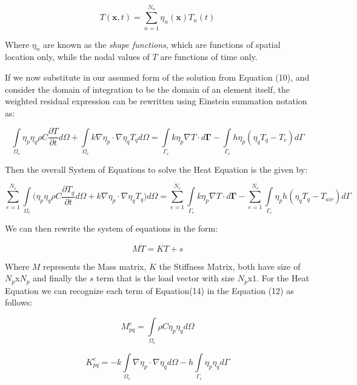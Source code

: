 \documentclass[12pt]{article}
\begin{document}
\begin{equation}
T(\mathbf{x},t) = \sum_{n=1}^{N_n} \eta_n(\mathbf{x})T_n(t)
\end{equation}

Where $\eta_n$ are known as the \textsl{shape functions}, which are functions of spatial location only, while the nodal values of $T$ are functions of time only. 

If we now substitute in our assumed form of the solution from Equation (10), and consider the domain of integration to be the domain of an element itself, the weighted residual expression can be rewritten using Einstein summation notation as:

	\begin{equation}
	\int\limits_{\Omega_e} \eta_p\eta_q \rho C \frac{\partial T}{\partial t} d\Omega + \int\limits_{\Omega_e} k \nabla \eta_p \cdot \nabla \eta_q T_q d\Omega = \int\limits_{\Gamma_{e}}{k\eta_p\nabla T} \cdot d \mathbf{\Gamma} - \int\limits_{\Gamma_{e}}h\eta_p(\eta_qT_q-T_{e}) d\Gamma
	\end{equation}

Then the overall System of Equations to solve the Heat Equation is the given by:

\begin{equation}
	\sum_{e=1}^{N_e}  \int\limits_{\Omega_e} \bigg(\eta_p\eta_q \rho C \frac{\partial T_q}{\partial t} d\Omega + k \nabla \eta_p \cdot \nabla \eta_q T_q\bigg) d\Omega = \sum_{e=1}^{N_e} \int\limits_{\Gamma_{e}}{k\eta_p\nabla T} \cdot d \mathbf{\Gamma} - \sum_{e=1}^{N_e} \int\limits_{\Gamma_{e}}\eta_p h (\eta_qT_q-T_{air}) d\Gamma
	\end{equation}

We can then rewrite the system of equations in the form:

\begin{equation}
 M\dot{T} = KT + s
\end{equation}

Where $M$ represents the Mass matrix, $K$ the Stiffness Matrix, both have size of $N_p$x$N_p$ and finally the $s$ term that is the load vector with size $N_p$x$1$. For the Heat Equation we can recognize each term of Equation(14) in the Equation (12) as follows:

\begin{equation}
 M_{pq}^e = \int\limits_{\Omega_e} \rho C \eta_p\eta_q  d\Omega
\end{equation}

\begin{equation}
 K_{pq}^e = - k \int\limits_{\Omega_e} \nabla \eta_p \cdot \nabla \eta_q d\Omega - h \int\limits_{\Gamma_e} \eta_p \eta_q d\Gamma
\end{equation}
\end{document}
